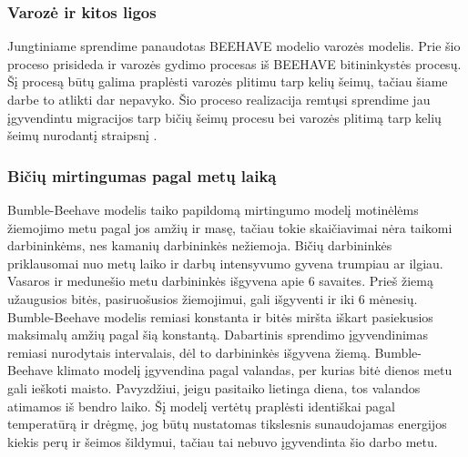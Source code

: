 \documentclass{VUMIFPSmagistrinis}
\begin{document}
\subsubsection{Varozė ir kitos ligos}
Jungtiniame sprendime panaudotas BEEHAVE modelio varozės modelis. Prie šio proceso prisideda ir varozės gydimo procesas iš BEEHAVE bitininkystės procesų. Šį procesą būtų galima praplėsti varozės plitimu tarp kelių šeimų, tačiau šiame darbe to atlikti dar nepavyko. Šio proceso realizacija remtųsi sprendime jau įgyvendintu migracijos tarp bičių šeimų procesu bei varozės plitimą tarp kelių šeimų nurodantį straipsnį \cite{NoD17}. 






\subsubsection{Bičių mirtingumas pagal metų laiką}
Bumble-Beehave modelis taiko papildomą mirtingumo modelį motinėlėms žiemojimo metu pagal jos amžių ir masę, tačiau tokie skaičiavimai nėra taikomi darbininkėms, nes kamanių darbininkės nežiemoja.
Bičių darbininkės priklausomai nuo metų laiko ir darbų intensyvumo gyvena trumpiau ar ilgiau. Vasaros ir medunešio metu darbininkės išgyvena apie 6 savaites. Prieš žiemą užaugusios bitės, pasiruošusios žiemojimui, gali išgyventi ir iki 6 mėnesių. Bumble-Beehave modelis remiasi konstanta ir bitės miršta iškart pasiekusios maksimalų amžių pagal šią konstantą. Dabartinis sprendimo įgyvendinimas remiasi nurodytais \cite{YYY19} intervalais, dėl to darbininkės išgyvena žiemą.
Bumble-Beehave klimato modelį įgyvendina pagal valandas, per kurias bitė dienos metu gali ieškoti maisto. Pavyzdžiui, jeigu pasitaiko lietinga diena, tos valandos atimamos iš bendro laiko. Šį modelį vertėtų praplėsti identiškai pagal temperatūrą ir drėgmę, jog būtų nustatomas tikslesnis sunaudojamas energijos kiekis perų ir šeimos šildymui, tačiau tai nebuvo įgyvendinta šio darbo metu.
\end{document}
